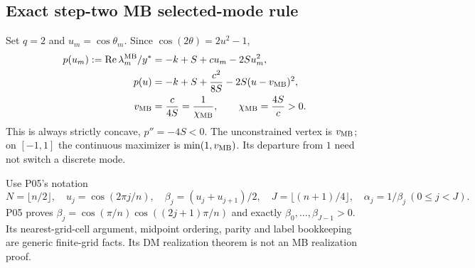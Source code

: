 \subsection{Exact step-two MB selected-mode rule}
\label{slot:P08-2}
Set $q=2$ and $u_m=\cos\theta_m$. Since $\cos(2\theta)=2u^2-1$,
\begin{align}
 p(u_m):=\operatorname{Re}\lambda_m^{\mathrm{MB}}/y^*&=-k+S+cu_m-2Su_m^2,
 \label{eq:P08-quadratic}\\
 p(u)&=-k+S+\frac{c^2}{8S}-2S(u-v_{\mathrm{MB}})^2,\nonumber\\
 v_{\mathrm{MB}}&=\frac{c}{4S}=\frac1{\chi_{\mathrm{MB}}},\qquad
 \chi_{\mathrm{MB}}=\frac{4S}{c}>0.\label{eq:P08-vertex}
\end{align}
This is always strictly concave, $p''=-4S<0$. The unconstrained vertex
is $v_{\mathrm{MB}}$; on $[-1,1]$ the continuous maximizer is
$\min(1,v_{\mathrm{MB}})$. Its departure from $1$ need not switch a discrete mode.

Use P05's notation
\[
 N=\lfloor n/2\rfloor,\quad u_j=\cos(2\pi j/n),\quad
 \beta_j=(u_j+u_{j+1})/2,\quad J=\lfloor(n+1)/4\rfloor,
 \quad\alpha_j=1/\beta_j\ (0\le j<J).
\]
P05 proves $\beta_j=\cos(\pi/n)\cos((2j+1)\pi/n)$ and exactly
$\beta_0,\ldots,\beta_{J-1}>0$. Its nearest-grid-cell argument,
midpoint ordering, parity and label bookkeeping are generic finite-grid
facts. Its DM realization theorem is not an MB realization proof.

